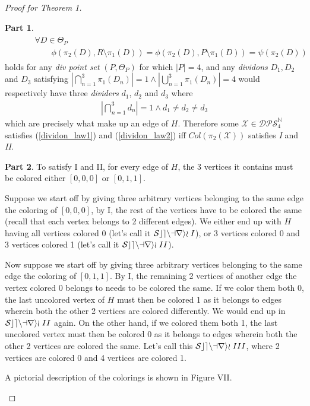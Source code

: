 \documentclass[11pt, oneside]{article}      %
\theoremstyle{definition}
\newtheorem{proofpart}{Part}[theo]
\numberwithin{equation}{section}
\newcommand{\reff}[1]{(\ref{#1})}
\theoremstyle{c}
\begin{document}
\begin{proof}[Proof for \textit{Theorem 1}]
\begin{proofpart}
\begin{align}
\begin{split}
&\qquad  \forall D \in \Theta_{P} \\
&\qquad \qquad  \phi(\pi_2(D),R \setminus \pi_1(D)) = \phi(\pi_2(D),P \setminus \pi_1(D)) = \psi(\pi_2(D))
\end{split}\end{align}
holds for any \textit{div point set} $(P,\Theta_P)$ for which $|P|=4$, and any \textit{dividons} $D_1, D_2$ and $D_3$ satisfying $|\bigcap_{n=1}^{3} \pi_1(D_n)| = 1 \land  |\bigcup_{n=1}^{3} \pi_1(D_n)| = 4$ would respectively have three \textit{dividers} $d_1$, $d_2$ and $d_3 $ where
\begin{gather}
|\bigcap_{n=1}^{3} d_n| = 1 \land d_1 \not= d_2 \not= d_3
\end{gather}
which are precisely what make up an edge of $H$. Therefore some $\mathscr{X} \in \mathscr{DPS}^\mathbb{N}_4$ satisfies \reff{dividon_law1} and  \reff{dividon_law2} iff $Col(\mathscr{\pi_2(X)})$ satisfies \textit{I} and \textit{II}.
\end{proofpart}
\begin{proofpart}
To satisfy I and II, for every edge of $H$, the 3 vertices it contains must be colored either $[0,0,0]$ or $[0,1,1]$.

Suppose we start off by giving three arbitrary vertices belonging to the same edge the coloring of $[0,0,0]$, by I, the rest of the vertices have to be colored the same (recall that each vertex belongs to 2 different edges). We either end up with $H$ having all vertices colored 0 (let's call it $\color{black}\mathcal{Scenario}\; I$), or 3 vertices colored 0 and 3 vertices colored 1 (let's call it $\color{black}\mathcal{Scenario}\; II$).

Now suppose we start off by giving three arbitrary vertices belonging to the same edge the coloring of $[0,1,1]$. By I, the remaining 2 vertices of another edge the vertex colored 0 belongs to needs to be colored the same. If we color them both 0, the last uncolored vertex of $H$ must then be colored 1 as it belongs to edges wherein both the other 2 vertices are colored differently. We would end up in $\color{black}\mathcal{Scenario}\; II$ again. On the other hand, if we colored them both 1, the last uncolored vertex must then be colored 0 as it belongs to edges wherein both the other 2 vertices are colored the same. Let's call this $\color{black}\mathcal{Scenario}\; III$, where 2 vertices are colored 0 and 4 vertices are colored 1.

A pictorial description of the colorings is shown in Figure VII.


\end{proofpart}
\end{proof}
\end{document}
